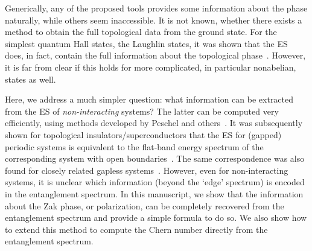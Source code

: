 \documentclass[twocolumn,amsmath,longbibliography,amssymb,superscriptaddress]{revtex4-1}
\begin{document}
Generically, any of the proposed tools provides some information about the phase naturally, while others seem inaccessible. 
It is not known, whether there exists a method to obtain the full topological data from the ground state. 
For the simplest quantum Hall states, the Laughlin states,  it was shown that the ES does, in fact, contain the full information about the topological phase~\cite{hermanns2011haldane}.
However, it is far from clear if this holds for more complicated, in particular nonabelian, states as well.  

Here, we address a much simpler question: what information can be extracted from the ES of \emph{non-interacting} systems?
The latter can be computed very efficiently, using methods developed by Peschel and others~\cite{Peschel2003}. 
It was subsequently shown for topological insulators/superconductors that the ES for (gapped) periodic systems is equivalent to the flat-band energy spectrum of the corresponding system with open boundaries~\cite{Fidkowski2010entanglement}. 
The same correspondence was also found for closely related gapless systems~\cite{Matern2018entanglement}.
However, even for non-interacting systems, it is unclear which information (beyond the  `edge' spectrum) is encoded in the entanglement spectrum. 
In this manuscript, we show that the information about the Zak phase, or polarization, can be completely recovered from the entanglement spectrum and provide a simple formula to do so. 
We also show how to extend this method to compute the Chern number directly from the entanglement spectrum. 
\end{document}
